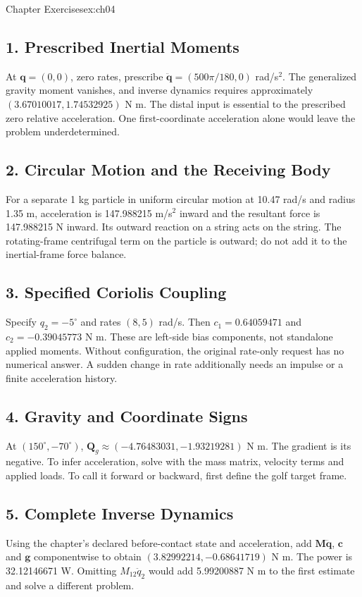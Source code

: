 \begin{exercises}{Chapter Exercises}{ex:ch04}
\subsection*{1. Prescribed Inertial Moments}
At \(\bm q=(0,0)\), zero rates, prescribe \(\ddot{\bm q}=(500\pi/180,0)\) rad/s\(^2\). The generalized gravity moment vanishes, and inverse dynamics requires approximately \((3.67010017,1.74532925)\) N m. The distal input is essential to the prescribed zero relative acceleration. One first-coordinate acceleration alone would leave the problem underdetermined.

\subsection*{2. Circular Motion and the Receiving Body}
For a separate 1 kg particle in uniform circular motion at 10.47 rad/s and radius 1.35 m, acceleration is 147.988215 m/s\(^2\) inward and the resultant force is 147.988215 N inward. Its outward reaction on a string acts on the string. The rotating-frame centrifugal term on the particle is outward; do not add it to the inertial-frame force balance.

\subsection*{3. Specified Coriolis Coupling}
Specify \(q_2=-5^\circ\) and rates \((8,5)\) rad/s. Then \(c_1=0.64059471\) and \(c_2=-0.39045773\) N m. These are left-side bias components, not standalone applied moments. Without configuration, the original rate-only request has no numerical answer. A sudden change in rate additionally needs an impulse or a finite acceleration history.

\subsection*{4. Gravity and Coordinate Signs}
At \((150^\circ,-70^\circ)\), \(\bm Q_g\approx(-4.76483031,-1.93219281)\) N m. The gradient is its negative. To infer acceleration, solve with the mass matrix, velocity terms and applied loads. To call it forward or backward, first define the golf target frame.

\subsection*{5. Complete Inverse Dynamics}
Using the chapter's declared before-contact state and acceleration, add \(\bm M\ddot{\bm q}\), \(\bm c\) and \(\bm g\) componentwise to obtain \((3.82992214,-0.68641719)\) N m. The power is 32.12146671 W. Omitting \(M_{12}\ddot q_2\) would add 5.99200887 N m to the first estimate and solve a different problem.


\end{exercises}
